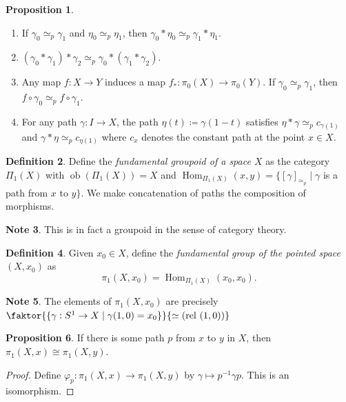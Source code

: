 \documentclass[10pt,letterpaper,cm]{nupset}
\theoremstyle{definition}
\newtheorem{definition}{Definition}[subsection]
\newtheorem{note}[definition]{Note}
\theoremstyle{theorem}
\newtheorem{prop}[definition]{Proposition}
\theoremstyle{remark}
\newcommand{\1}{\mathbb{1}}
\newcommand{\0}{\vec 0}
\DeclareMathOperator{\Hom}{Hom}
\DeclareMathOperator{\ob}{ob}
\DeclareMathOperator{\rel}{rel}
\begin{document}
\begin{prop} $ $
\begin{enumerate}
\item If $\gamma_0 \simeq_p \gamma_1$ and $\eta_0 \simeq_p \eta_1$, then $\gamma_0 \ast \eta_0 \simeq_p \gamma_1 \ast \eta_1$.
\item $(\gamma_0 \ast \gamma_1)\ast \gamma_2 \simeq_p \gamma_0 \ast (\gamma_1 \ast \gamma_2)$.
\item Any map $f: X \to Y$ induces a map $f_{\ast} : \pi_0(X) \to \pi_0(Y)$. If $\gamma_0 \simeq_p \gamma_1$, then $f\circ \gamma_0 \simeq_p f\circ \gamma_1$.
\item For any path $\gamma : I \to X$, the path $\eta(t) \coloneqq  \gamma(1-t)$ satisfies $\eta \ast \gamma \simeq_p c_{\gamma(1)}$ and $\gamma \ast \eta \simeq_p c_{\eta(1)}$ where $c_x$ denotes the constant path at the point $x\in X$.
\end{enumerate}
\end{prop}

\begin{definition}
Define the \textit{fundamental groupoid of a space $X$} as the category $\Pi_1(X)$ with $\ob(\Pi_1(X)) = X$ and $\Hom_{\Pi_1(X)}(x,y) = \{[\gamma]_{\simeq_p} \mid \gamma$ is a path from $x$ to $y\}$. We make concatenation of paths the composition of morphisms. 
\end{definition}
\begin{note}
This is in fact a groupoid in the sense of category theory.
\end{note}

\begin{definition}
Given $x_0 \in X$, define the \textit{fundamental group of the pointed space $(X, x_0)$} as $$\pi_1(X, x_0) = \Hom_{\Pi_1(X)}(x_0,x_0) .$$ 
\end{definition}

\begin{note}
The elements of $\pi_1(X, x_0)$ are precisely $\faktor{\{\gamma : S^1 \to X \mid \gamma(1,0) =x_0\}}{\simeq (\rel \ (1,0))}$
\end{note}

\begin{prop}
If there is some path $p$ from $x$ to $y$ in $X$, then $\pi_1(X, x) \cong \pi_1(X, y)$.
\end{prop}
\begin{proof}
Define $\varphi_p : \pi_1(X, x) \to \pi_1(X, y)$ by $\gamma \mapsto p^{-1} \gamma p$. This is an isomorphism. 
\end{proof}
\end{document}
